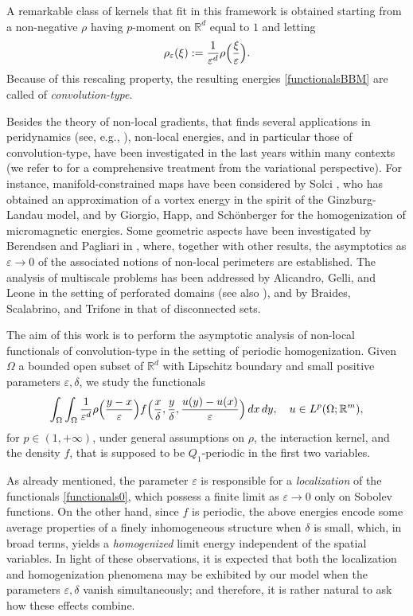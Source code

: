 \documentclass{article}
\theoremstyle{definition}
\newcommand{\e}{\varepsilon}
\newcommand{\R}{\mathbb{R}}
\begin{document}
A remarkable class of kernels that fit in this framework is obtained starting from a non-negative $\rho$ having $p$-moment on $\R^d$ equal to $1$ and letting
\begin{equation*}
    \rho_\e(\xi):=\frac{1}{\e^d}\rho\Bigl(\frac{\xi}{\e}\Bigr).
\end{equation*}
Because of this rescaling property, the resulting energies \eqref{functionalsBBM} are called of {\em convolution-type}.

Besides the theory of non-local gradients, that finds several applications in peridynamics (see, e.g., \cite{BM, BMP, MQ}), non-local energies, and in particular those of convolution-type, have been investigated in the last years within many contexts (we refer to \cite{AABPT} for a comprehensive treatment from the variational perspective). For instance, manifold-constrained maps have been considered by Solci \cite{S}, who has obtained an approximation of a vortex energy in the spirit of the Ginzburg-Landau model, and by Giorgio, Happ, and Sch\"onberger \cite{GHS} for the homogenization of micromagnetic energies. Some geometric aspects have been investigated by Berendsen and Pagliari in \cite{BP}, where, together with other results, the asymptotics as $\e\to0$ of the  associated notions of non-local perimeters are established. The analysis of multiscale problems has been addressed by Alicandro, Gelli, and Leone \cite{AGL} in the setting of perforated domains (see also \cite{BP1, BP2}), and by Braides, Scalabrino, and Trifone \cite{BST} in that of disconnected sets.  

The aim of this work is to perform the asymptotic analysis of non-local functionals of convolution-type in the setting of periodic homogenization. Given $\Omega$ a bounded open subset of $\R^d$ with Lipschitz boundary and small positive parameters $\varepsilon, \delta$, we study the functionals 
\begin{equation}\label{functionals0}
\int_\Omega\int_\Omega \frac{1}{\e^d}\rho\Bigl(\frac{y-x}{\e}\Bigr)f\Bigl(\frac{x}{\delta},\frac{y}{\delta},\frac{u(y)-u(x)}{\e}\Bigr)\, dx\,dy, \quad u\in L^p(\Omega; \R^m),
\end{equation}
for $p\in(1,+\infty)$, under general assumptions on $\rho$, the interaction kernel, and the density $f$, that is supposed to be $Q_1$-periodic in the first two variables. 

As already mentioned, the parameter $\e$ is responsible for a {\em localization} of the functionals \eqref{functionals0}, which possess a finite limit as $\e\to0$ only on Sobolev functions. On the other hand, since $f$ is periodic, the above energies encode some average properties of a finely inhomogeneous structure when $\delta$ is small, which, in broad terms, yields a {\em homogenized} limit energy independent of the spatial variables. In light of these observations, it is expected that both the localization and homogenization phenomena may be exhibited by our model when the parameters $\e, \delta$ vanish simultaneously; and therefore, it is rather natural to ask how these effects combine.
\end{document}
